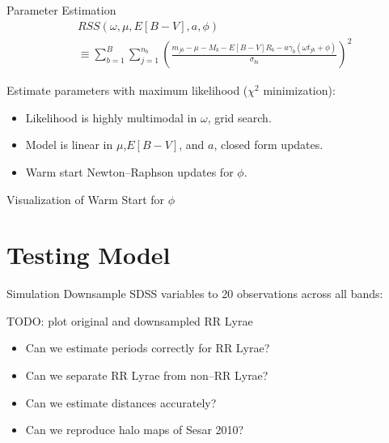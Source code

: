 \documentclass[12pt]{beamer}
\begin{document}
\begin{frame}{Parameter Estimation}
\begin{align*}
&RSS(\omega,\mu,E[B-V],a,\phi) \\
 &\equiv\sum_{b=1}^B \sum_{j=1}^{n_b}\left(\frac{m_{jb} - \mu - M_b - E[B-V]R_b - a\gamma_b(\omega t_{jb} + \phi)}{\sigma_{bi}}\right)^2
\end{align*}


Estimate parameters with maximum likelihood ($\chi^2$ minimization):
\begin{itemize}
\item Likelihood is highly multimodal in $\omega$, grid search.
\item Model is linear in $\mu$,$E[B-V]$, and $a$, closed form updates.
\item Warm start Newton--Raphson updates for $\phi$.
\end{itemize}

\end{frame}


\begin{frame}{Visualization of Warm Start for $\phi$}

\end{frame}

\section{Testing Model}

\begin{frame}{Simulation}
Downsample SDSS variables to 20 observations across all bands:


TODO: plot original and downsampled RR Lyrae

\begin{itemize}
\item Can we estimate periods correctly for RR Lyrae?
\item Can we separate RR Lyrae from non--RR Lyrae? 
\item Can we estimate distances accurately?
\item Can we reproduce halo maps of Sesar 2010?
\end{itemize}


\end{frame}
\end{document}
